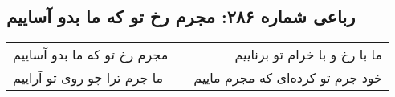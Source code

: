 \begin{center}
\section*{رباعی شماره ۲۸۶: مجرم رخ تو که ما بدو آساییم}
\label{sec:sh286}
\begin{longtable}{l p{0.5cm} r}
مجرم رخ تو که ما بدو آساییم
&&
ما با رخ و با خرام تو برناییم
\\
ما جرم ترا چو روی تو آراییم
&&
خود جرم تو کرده‌ای که مجرم ماییم
\\
\end{longtable}
\end{center}

